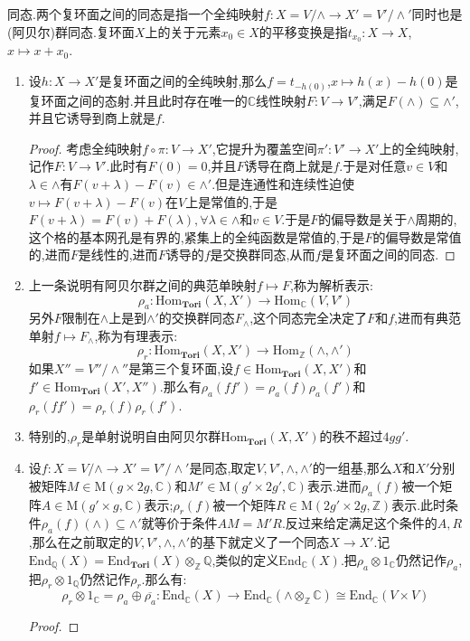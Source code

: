 同态.两个复环面之间的同态是指一个全纯映射$f:X=V/\wedge\to X'=V'/\wedge'$同时也是(阿贝尔)群同态.复环面$X$上的关于元素$x_0\in X$的平移变换是指$t_{x_0}:X\to X$,$x\mapsto x+x_0$.
\begin{enumerate}
	\item 设$h:X\to X'$是复环面之间的全纯映射,那么$f=t_{-h(0)}$,$x\mapsto h(x)-h(0)$是复环面之间的态射.并且此时存在唯一的$\mathbb{C}$线性映射$F:V\to V'$,满足$F(\wedge)\subseteq\wedge'$,并且它诱导到商上就是$f$.
	\begin{proof}
		
		考虑全纯映射$f\circ\pi:V\to X'$,它提升为覆盖空间$\pi':V'\to X'$上的全纯映射,记作$F:V\to V'$.此时有$F(0)=0$,并且$F$诱导在商上就是$f$.于是对任意$v\in V$和$\lambda\in\wedge$有$F(v+\lambda)-F(v)\in\wedge'$.但是连通性和连续性迫使$v\mapsto F(v+\lambda)-F(v)$在$V$上是常值的,于是$F(v+\lambda)=F(v)+F(\lambda),\forall\lambda\in\wedge$和$v\in V$.于是$F$的偏导数是关于$\wedge$周期的,这个格的基本网孔是有界的,紧集上的全纯函数是常值的,于是$F$的偏导数是常值的,进而$F$是线性的,进而$F$诱导的$f$是交换群同态,从而$f$是复环面之间的同态.
	\end{proof}
	\item 上一条说明有阿贝尔群之间的典范单映射$f\mapsto F$,称为解析表示:
	$$\rho_a:\mathrm{Hom}_{\textbf{Tori}}(X,X')\to\mathrm{Hom}_{\mathbb{C}}(V,V')$$
	另外$F$限制在$\wedge$上是到$\wedge'$的交换群同态$F_{\wedge}$,这个同态完全决定了$F$和$f$,进而有典范单射$f\mapsto F_{\wedge}$,称为有理表示:
	$$\rho_r:\mathrm{Hom}_{\textbf{Tori}}(X,X')\to\mathrm{Hom}_{\mathbb{Z}}(\wedge,\wedge')$$
	如果$X''=V''/\wedge''$是第三个复环面,设$f\in\mathrm{Hom}_{\textbf{Tori}}(X,X')$和$f'\in\mathrm{Hom}_{\textbf{Tori}}(X',X'')$.那么有$\rho_a(ff')=\rho_a(f)\rho_a(f')$和$\rho_r(ff')=\rho_r(f)\rho_r(f')$.
	\item 特别的,$\rho_r$是单射说明自由阿贝尔群$\mathrm{Hom}_{\textbf{Tori}}(X,X')$的秩不超过$4gg'$.
	\item 设$f:X=V/\wedge\to X'=V'/\wedge'$是同态,取定$V,V',\wedge,\wedge'$的一组基,那么$X$和$X'$分别被矩阵$M\in\mathrm{M}(g\times2g,\mathbb{C})$和$M'\in\mathrm{M}(g'\times2g',\mathbb{C})$表示.进而$\rho_a(f)$被一个矩阵$A\in\mathrm{M}(g'\times g,\mathbb{C})$表示;$\rho_r(f)$被一个矩阵$R\in\mathrm{M}(2g'\times2g,\mathbb{Z})$表示.此时条件$\rho_a(f)(\wedge)\subseteq\wedge'$就等价于条件$AM=M'R$.反过来给定满足这个条件的$A,R$,那么在之前取定的$V,V',\wedge,\wedge'$的基下就定义了一个同态$X\to X'$.记$\mathrm{End}_{\mathbb{Q}}(X)=\mathrm{End}_{\textbf{Tori}}(X)\otimes_{\mathbb{Z}}\mathbb{Q}$,类似的定义$\mathrm{End}_{\mathbb{C}}(X)$.把$\rho_a\otimes1_{\mathbb{C}}$仍然记作$\rho_a$,把$\rho_r\otimes1_{\mathbb{Q}}$仍然记作$\rho_r$.那么有:
	$$\rho_r\otimes1_{\mathbb{C}}=\rho_a\oplus\overline{\rho_a}:\mathrm{End}_{\mathbb{C}}(X)\to\mathrm{End}_{\mathbb{C}}(\wedge\otimes_{\mathbb{Z}}\mathbb{C})\cong\mathrm{End}_{\mathbb{C}}(V\times V)$$
	\begin{proof}
		

\end{proof}
\end{enumerate}
